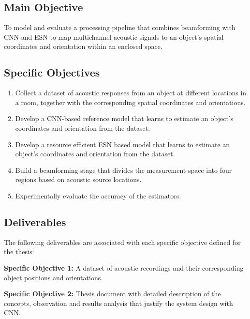 \subsection{Main Objective}
\label{section:main-objective}
\label{objective:main}

To model and evaluate a processing pipeline that combines beamforming with CNN and ESN to map multichannel acoustic signals to an object's spatial coordinates and orientation within an enclosed space.

\subsection{Specific Objectives}
\label{section:specific-objectives}

\begin{enumerate}
	\item Collect a dataset of acoustic responses from an object at different locations in a room, together with the corresponding spatial coordinates and orientations.
	
	\item Develop a CNN-based reference model that learns to estimate an object's coordinates and orientation from the dataset.

    \item Develop a resource efficient ESN based model that learns to estimate an object's coordinates and orientation from the dataset.

    \item Build a beamforming stage that divides the measurement space into four regions based on acoustic source locations.
	
	\item Experimentally evaluate the accuracy of the estimators.
	
\end{enumerate}

\subsection{Deliverables}
The following deliverables are associated with each specific objective defined for the thesis:

\textbf{Specific Objective 1:}
 A dataset of acoustic recordings and their corresponding object positions and orientations.

\textbf{Specific Objective 2:}
Thesis document with detailed description of the concepts, observation and results analysis that justify the system design with CNN.


